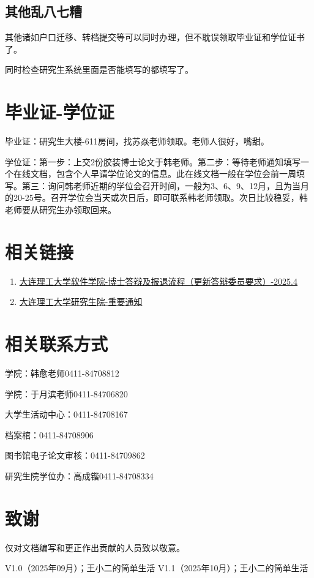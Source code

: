 \documentclass[12pt,a4paper]{ctexart}
\begin{document}
\subsection{其他乱八七糟}
\label{sec:luanbaqizao}

其他诸如户口迁移、转档提交等可以同时办理，但不耽误领取毕业证和学位证书了。

同时检查研究生系统里面是否能填写的都填写了。

  \section{毕业证-学位证}
\label{sec:certi}

毕业证：研究生大楼-611房间，找苏焱老师领取。老师人很好，嘴甜。

学位证：第一步：上交2份胶装博士论文于韩老师。第二步：等待老师通知填写一个在线文档，包含个人早请学位论文的信息。此在线文档一般在学位会前一周填写。第三：询问韩老师近期的学位会召开时间，一般为3、6、9、12月，且为当月的20-25号。召开学位会当天或次日后，即可联系韩老师领取。次日比较稳妥，韩老师要从研究生办领取回来。



\section{相关链接}
\label{sec:UsedLinks}
\begin{enumerate}
\item \href{https://ss.dlut.edu.cn/info/1341/24831.htm}{大连理工大学软件学院-博士答辩及报退流程（更新答辩委员要求）-2025.4}
  \item \href{https://gs.dlut.edu.cn/yjspy/pygcguan_li/zytz.htm}{大连理工大学研究生院-重要通知}
\end{enumerate}


\section{相关联系方式}
\label{sec:contact}

学院：韩愈老师0411-84708812

学院：于月滨老师0411-84706820

大学生活动中心：0411-84708167

档案棺：0411-84708906

图书馆电子论文审核：0411-84709862

研究生院学位办：高成锴0411-84708334

\section{致谢}
\label{sec:ack}

仅对文档编写和更正作出贡献的人员致以敬意。

V1.0（2025年09月）；王小二的简单生活
V1.1（2025年10月）；王小二的简单生活
\end{document}
